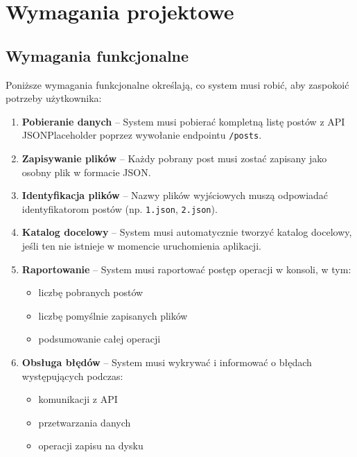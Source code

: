 \documentclass[12pt,a4paper]{article}
\begin{document}
\section{Wymagania projektowe}

\subsection{Wymagania funkcjonalne}
Poniższe wymagania funkcjonalne określają, co system musi robić, aby zaspokoić potrzeby użytkownika:

\begin{enumerate}
    \item \textbf{Pobieranie danych} -- System musi pobierać kompletną listę postów z API JSONPlaceholder poprzez wywołanie endpointu \texttt{/posts}.
    
    \item \textbf{Zapisywanie plików} -- Każdy pobrany post musi zostać zapisany jako osobny plik w formacie JSON.
    
    \item \textbf{Identyfikacja plików} -- Nazwy plików wyjściowych muszą odpowiadać identyfikatorom postów (np. \texttt{1.json}, \texttt{2.json}).
    
    \item \textbf{Katalog docelowy} -- System musi automatycznie tworzyć katalog docelowy, jeśli ten nie istnieje w momencie uruchomienia aplikacji.
    
    \item \textbf{Raportowanie} -- System musi raportować postęp operacji w konsoli, w tym:
    \begin{itemize}
        \item liczbę pobranych postów
        \item liczbę pomyślnie zapisanych plików
        \item podsumowanie całej operacji
    \end{itemize}
    
    \item \textbf{Obsługa błędów} -- System musi wykrywać i informować o błędach występujących podczas:
    \begin{itemize}
        \item komunikacji z API
        \item przetwarzania danych
        \item operacji zapisu na dysku
    \end{itemize}
\end{enumerate}
\end{document}
